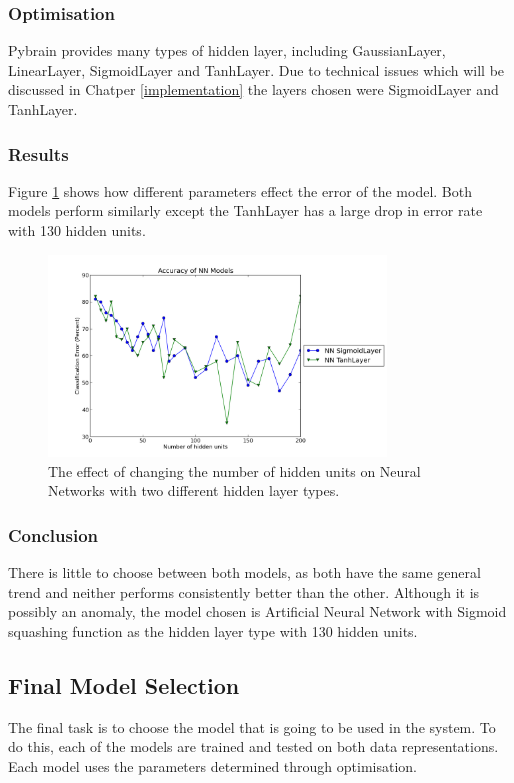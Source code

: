 \subsubsection{Optimisation}
Pybrain provides many types of hidden layer, including GaussianLayer, LinearLayer, SigmoidLayer and TanhLayer. Due to technical issues which will be discussed in Chatper \ref{implementation} the layers chosen were SigmoidLayer and TanhLayer.

\subsubsection{Results}
Figure \ref{fig:nnall200} shows how different parameters effect the error of the model. Both models perform similarly except the TanhLayer has a large drop in error rate with 130 hidden units.

\begin{figure}[h!]
\centering
\includegraphics[width=0.8\textwidth]{images/nnall200.png}
\caption{The effect of changing the number of hidden units on Neural Networks with two different hidden layer types.}
\label{fig:nnall200}
\end{figure}

\subsubsection{Conclusion}
There is little to choose between both models, as both have the same general trend and neither performs consistently better than the other. Although it is possibly an anomaly, the model chosen is Artificial Neural Network with Sigmoid squashing function as the hidden layer type with 130 hidden units.

\subsection{Final Model Selection}
The final task is to choose the model that is going to be used in the system. To do this, each of the models are trained and tested on both data representations. Each model uses the parameters determined through optimisation.

